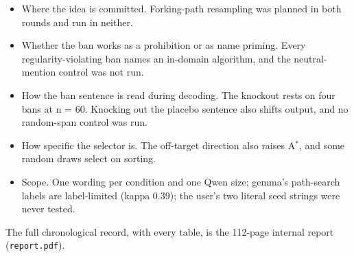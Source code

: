 \documentclass[10pt,letterpaper]{article}
\begin{document}
\begin{itemize}\setlength{\itemsep}{1pt}
\item Where the idea is committed. Forking-path resampling was planned in both rounds and run in neither.
\item Whether the ban works as a prohibition or as name priming. Every regularity-violating ban names an in-domain algorithm, and the neutral-mention control was not run.
\item How the ban sentence is read during decoding. The knockout rests on four bans at n = 60. Knocking out the placebo sentence also shifts output, and no random-span control was run.
\item How specific the selector is. The off-target direction also raises A$^*$, and some random draws select on sorting.
\item Scope. One wording per condition and one Qwen size; gemma's path-search labels are label-limited (kappa 0.39); the user's two literal seed strings were never tested.
\end{itemize}

\small The full chronological record, with every table, is the 112-page internal report (\texttt{report.pdf}).
\end{document}
